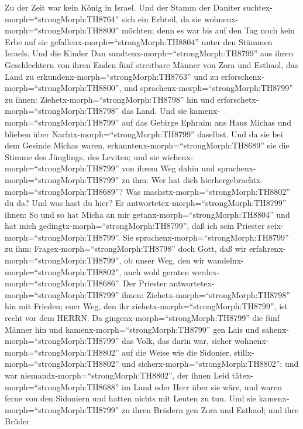 Zu der Zeit war kein König in Israel. Und der Stamm der
Daniter suchtex-morph=``strongMorph:TH8764'' sich ein Erbteil, da sie
wohnenx-morph=``strongMorph:TH8800'' möchten; denn es war bis auf den
Tag noch kein Erbe auf sie gefallenx-morph=``strongMorph:TH8804'' unter
den Stämmen Israels.  Und die Kinder Dan
sandtenx-morph=``strongMorph:TH8799'' aus ihren Geschlechtern von ihren
Enden fünf streitbare Männer von Zora und Esthaol, das Land zu
erkundenx-morph=``strongMorph:TH8763'' und zu
erforschenx-morph=``strongMorph:TH8800'', und
sprachenx-morph=``strongMorph:TH8799'' zu ihnen:
Ziehetx-morph=``strongMorph:TH8798'' hin und
erforschetx-morph=``strongMorph:TH8798'' das Land. Und sie
kamenx-morph=``strongMorph:TH8799'' auf das Gebirge Ephraim ans Haus
Michas und blieben über Nachtx-morph=``strongMorph:TH8799'' daselbst.
 Und da sie bei dem Gesinde Michas waren,
erkanntenx-morph=``strongMorph:TH8689'' sie die Stimme des Jünglings,
des Leviten; und sie wichenx-morph=``strongMorph:TH8799'' von ihrem Weg
dahin und sprachenx-morph=``strongMorph:TH8799'' zu ihm: Wer hat dich
hierhergebrachtx-morph=``strongMorph:TH8689''? Was
machstx-morph=``strongMorph:TH8802'' du da? Und was hast du hier?
 Er antwortetex-morph=``strongMorph:TH8799'' ihnen: So und
so hat Micha an mir getanx-morph=``strongMorph:TH8804'' und hat mich
gedingtx-morph=``strongMorph:TH8799'', daß ich sein Priester
seix-morph=``strongMorph:TH8799''.  Sie
sprachenx-morph=``strongMorph:TH8799'' zu ihm:
Fragex-morph=``strongMorph:TH8798'' doch Gott, daß wir
erfahrenx-morph=``strongMorph:TH8799'', ob unser Weg, den wir
wandelnx-morph=``strongMorph:TH8802'', auch wohl geraten
werdex-morph=``strongMorph:TH8686''.  Der Priester
antwortetex-morph=``strongMorph:TH8799'' ihnen:
Ziehetx-morph=``strongMorph:TH8798'' hin mit Frieden; euer Weg, den ihr
ziehetx-morph=``strongMorph:TH8799'', ist recht vor dem HERRN.
 Da gingenx-morph=``strongMorph:TH8799'' die fünf Männer hin
und kamenx-morph=``strongMorph:TH8799'' gen Lais und
sahenx-morph=``strongMorph:TH8799'' das Volk, das darin war, sicher
wohnenx-morph=``strongMorph:TH8802'' auf die Weise wie die Sidonier,
stillx-morph=``strongMorph:TH8802'' und
sicherx-morph=``strongMorph:TH8802''; und war
niemandx-morph=``strongMorph:TH8802'', der ihnen Leid
tätex-morph=``strongMorph:TH8688'' im Land oder Herr über sie wäre, und
waren ferne von den Sidoniern und hatten nichts mit Leuten zu tun.
 Und sie kamenx-morph=``strongMorph:TH8799'' zu ihren
Brüdern gen Zora und Esthaol; und ihre Brüder
